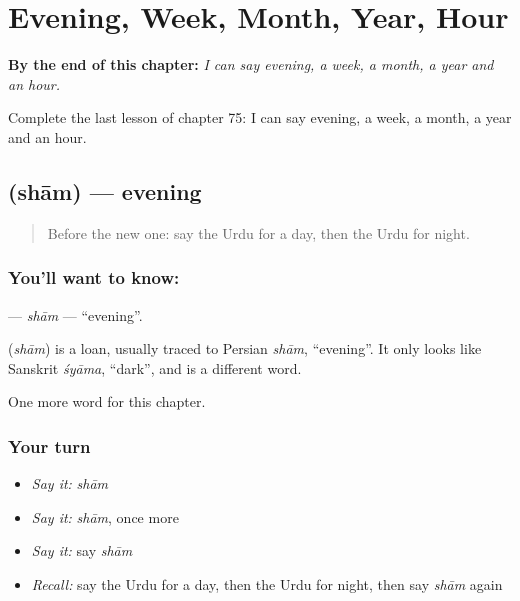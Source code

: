 
\chapter{Evening, Week, Month, Year, Hour}
\label{ch:ur-evening-week-month-year-hour}

\begin{chapteropening}
\textbf{By the end of this chapter:} \emph{I can say evening, a week, a month, a year and an hour.}

Complete the last lesson of chapter 75: I can say evening, a week, a month, a year and an hour.
\end{chapteropening}

\section[\texorpdfstring{\ur{شام} (shām)}{شام (shām)}]{ (shām) — evening}

\label{lesson:UR-C75-sham}



\begin{quote}
Before the new one: say the Urdu for a day, then the Urdu for night.
\end{quote}

\subsection*{You'll want to know: }
\textbf{} — \emph{shām} — \textquotedblleft{}evening\textquotedblright{}.

\begin{cousinweb}
\textbf{} (\emph{shām}) is a loan, usually traced to Persian \emph{shām}, \textquotedblleft{}evening\textquotedblright{}. It only looks like Sanskrit \emph{śyāma}, \textquotedblleft{}dark\textquotedblright{}, and is a different word.
\end{cousinweb}

\begin{grammarlens}[title={What you've built}]
One more word for this chapter.
\end{grammarlens}

\subsection*{Your turn}
\begin{itemize}
\raggedright
  \item \emph{Say it:} \emph{shām}
  \item \emph{Say it:} \emph{shām}, once more
  \item \emph{Say it:} say \emph{shām}
  \item \emph{Recall:} say the Urdu for a day, then the Urdu for night, then say \emph{shām} again
\end{itemize}

